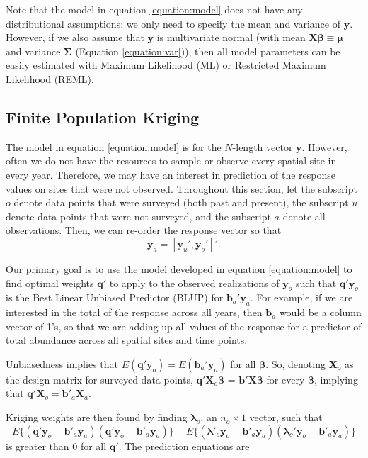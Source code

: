 \documentclass[]{interact}
\theoremstyle{plain}%
\theoremstyle{definition}
\theoremstyle{remark}
\begin{document}
Note that the model in equation \ref{equation:model} does not have any
distributional assumptions: we only need to specify the mean and
variance of \(\mathbf{y}\). However, if we also assume that
\(\mathbf{y}\) is multivariate normal (with mean
\(\mathbf{X} \bm{\beta} \equiv \bm{\mu}\) and variance \(\bm{\Sigma}\)
(Equation \ref{equation:var})), then all model parameters can be easily
estimated with Maximum Likelihood (ML) or Restricted Maximum Likelihood
(REML).

\subsection{Finite Population Kriging}

The model in equation \ref{equation:model} is for the \(N\)-length
vector \(\mathbf{y}\). However, often we do not have the resources to
sample or observe every spatial site in every year. Therefore, we may
have an interest in prediction of the response values on sites that were
not observed. Throughout this section, let the subscript \(o\) denote
data points that were surveyed (both past and present), the subscript
\(u\) denote data points that were not surveyed, and the subscript \(a\)
denote all observations. Then, we can re-order the response vector so
that \mbox{} \begin{equation}
\mathbf{y}_a = [\mathbf{y}_u', \mathbf{y}_o']'.
\end{equation}

Our primary goal is to use the model developed in equation
\ref{equation:model} to find optimal weights \(\mathbf{q}'\) to apply to
the observed realizations of \(\mathbf{y}_o\) such that
\(\mathbf{q}' \mathbf{y}_o\) is the Best Linear Unbiased Predictor
(BLUP) for \(\mathbf{b}_a' \mathbf{y}_a\). For example, if we are
interested in the total of the response across all years, then
\(\mathbf{b}_a\) would be a column vector of 1's, so that we are adding
up all values of the response for a predictor of total abundance across
all spatial sites and time points.

Unbiasedness implies that
\(E(\mathbf{q'}\mathbf{y}_o) = E(\mathbf{b}_a'\mathbf{y}_a)\) for all
\(\bm{\beta}\). So, denoting \(\mathbf{X}_o\) as the design matrix for
surveyed data points, \(\mathbf{q'} \mathbf{X}_o \bm{\beta}\) =
\(\mathbf{b'} \mathbf{X} \bm{\beta}\) for every \(\bm{\beta}\), implying
that \(\mathbf{q'} \mathbf{X}_o = \mathbf{b'}_a \mathbf{X}_a\).

Kriging weights are then found by finding \(\bm{\lambda}_o\), an
\(n_o \times 1\) vector, such that \mbox{} \begin{equation}
E\{(\mathbf{q'}\mathbf{y}_o - \mathbf{b'}_a \mathbf{y}_a)(\mathbf{q'}\mathbf{y}_o - \mathbf{b'}_a \mathbf{y}_a)\} - E\{(\bm{\lambda'}_o\mathbf{y}_o - \mathbf{b'}_a \mathbf{y}_a)(\bm{\lambda}_o'\mathbf{y}_o - \mathbf{b'}_a \mathbf{y}_a)\}
\end{equation} \noindent is greater than 0 for all \(\mathbf{q'}\). The
prediction equations are
\end{document}
